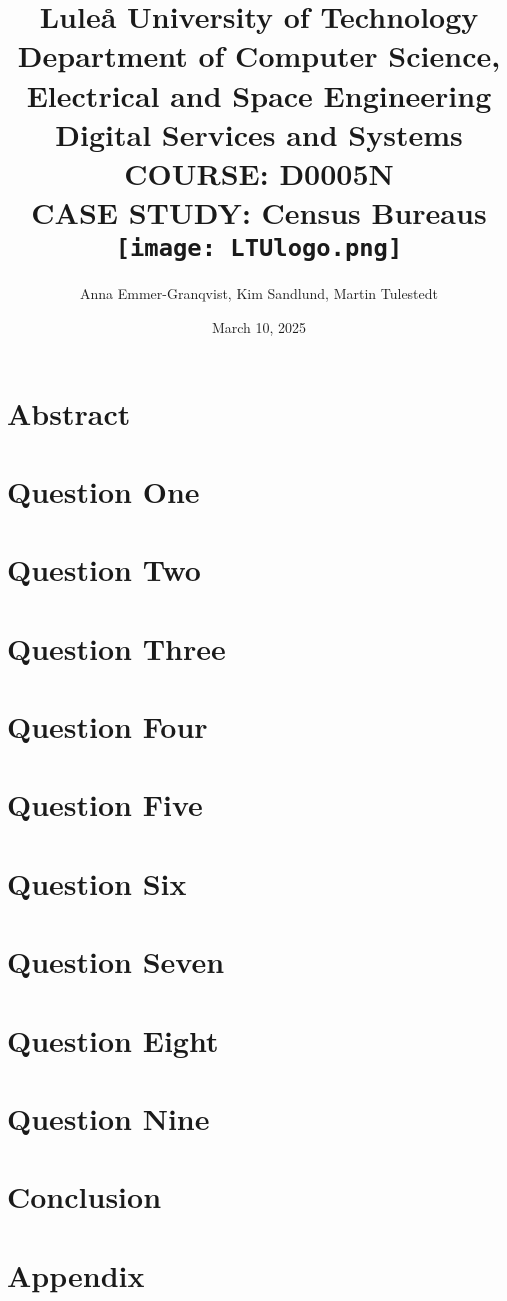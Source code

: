 \documentclass[12pt,a4paper]{report}
\title{
    {\large Luleå University of Technology}\\
    {\large Department of Computer Science, Electrical and Space Engineering}\\
    {\large Digital Services and Systems}\\
    {\large COURSE: D0005N}\\
    {CASE STUDY: Census Bureaus}\\
    {\centering\texttt{[image: LTUlogo.png]}}\\
}
\author{Anna Emmer-Granqvist, Kim Sandlund, Martin Tulestedt}
\date{March 10, 2025}
\begin{document}
\maketitle

\chapter*{Abstract}



\tableofcontents

\chapter{Question One}

\label{sec:question1}

\chapter{Question Two}
\label{sec:question2}


\chapter{Question Three}
\label{sec:question3}


\chapter{Question Four}
\label{sec:question4}


\chapter{Question Five}
\label{sec:question5}


\chapter{Question Six}
\label{sec:question6}


\chapter{Question Seven}
\label{sec:question7}


\chapter{Question Eight}
\label{sec:question8}


\chapter{Question Nine}
\label{sec:question9}


\chapter{Conclusion}
\label{sec:conclusion}


\chapter{Appendix}
\label{sec:appendix}


\printbibliography
\end{document}
